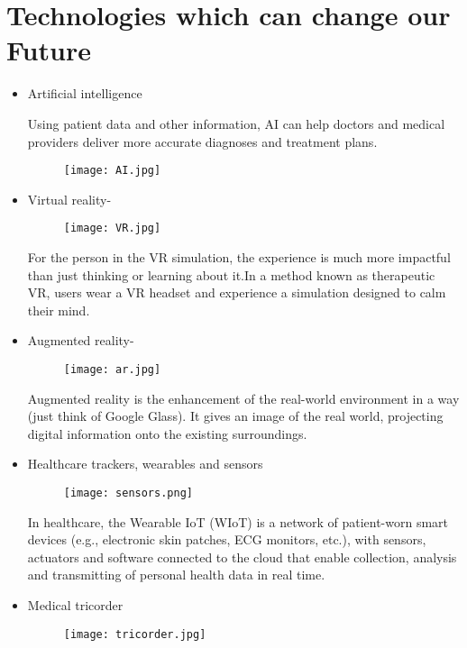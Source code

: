 \documentclass[11pt]{article}
\begin{document}
\section{{\Large Technologies which can change our Future }}
\begin{itemize}

\item Artificial intelligence

\raggedright Using patient data and other information, AI can help doctors and medical providers deliver more accurate diagnoses and treatment plans.
\begin{figure}[h]
\centering \texttt{[image: AI.jpg]}
\end{figure}
\item Virtual reality-
 \begin{figure}[h]
\centering \texttt{[image: VR.jpg]}
\end{figure}
 For the person in the VR simulation, the experience is much more impactful than just thinking or learning about it.In a method known as therapeutic VR, users wear a VR headset and experience a simulation designed to calm their mind.
\item Augmented reality-
\begin{figure}[h]
\centering \texttt{[image: ar.jpg]}
\end{figure}

Augmented reality is the enhancement of the real-world environment in a way (just think of Google Glass). It gives an image of the real world, projecting digital information onto the existing surroundings. 
\item Healthcare trackers, wearables and sensors
  \begin{figure}[h]
\centering \texttt{[image: sensors.png]}
\end{figure}
  In healthcare, the Wearable IoT (WIoT) is a network of patient-worn smart devices (e.g., electronic skin patches, ECG monitors, etc.), with sensors, actuators and software connected to the cloud that enable collection, analysis and transmitting of personal health data in real time.
  
\item Medical tricorder
\begin{figure}[h]
\centering \texttt{[image: tricorder.jpg]}
\end{figure}


\end{itemize}
\end{document}
